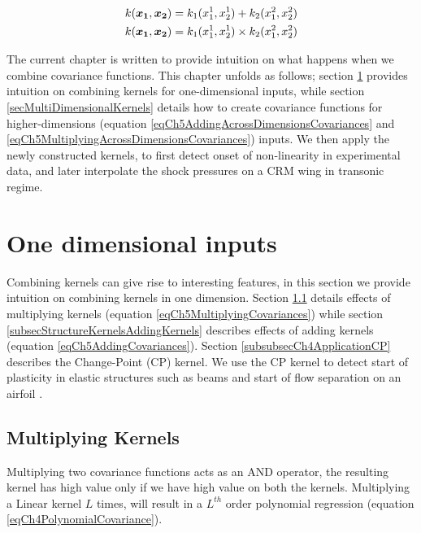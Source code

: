 \begin{align}
k(\boldsymbol{x_{1}}, \boldsymbol{x_{2}}) = k_{1}(x_{1}^{1}, x_{2}^{1}) + k_{2}(x_{1}^{2}, x_{2}^{2}) \label{eqCh5AddingAcrossDimensionsCovariances} \\
k(\boldsymbol{x_{1}}, \boldsymbol{x_{2}}) = k_{1}(x_{1}^{1}, x_{2}^{1}) \times k_{2}(x_{1}^{2}, x_{2}^{2}) \label{eqCh5MultiplyingAcrossDimensionsCovariances} 
\end{align}

The current chapter is written to provide intuition on what happens when we combine covariance functions. This chapter unfolds as follows; section \ref{secSingleDimension} provides intuition on combining kernels for one-dimensional inputs, while section \ref{secMultiDimensionalKernels} details how to create covariance functions for higher-dimensions (equation \ref{eqCh5AddingAcrossDimensionsCovariances} and \ref{eqCh5MultiplyingAcrossDimensionsCovariances}) inputs. We then apply the newly constructed kernels, to first detect onset of non-linearity in experimental data, and later interpolate the shock pressures on a CRM wing in transonic regime.

\section{One dimensional inputs}\label{secSingleDimension}
Combining kernels can give rise to interesting features, in this section we provide intuition on combining kernels in one dimension. Section \ref{subsecStructureKernelsMultiplyingKernels} details effects of multiplying kernels (equation \ref{eqCh5MultiplyingCovariances}) while section \ref{subsecStructureKernelsAddingKernels} describes effects of adding kernels (equation \ref{eqCh5AddingCovariances}). Section \ref{subsubsecCh4ApplicationCP} describes the Change-Point (CP) kernel. We use the CP kernel to detect start of plasticity in elastic structures such as beams and start of flow separation on an airfoil \cite{chiplunkar:hal-01555401}. 


\subsection{Multiplying Kernels} \label{subsecStructureKernelsMultiplyingKernels}
Multiplying two covariance functions acts as an AND operator, the resulting kernel has high value only if we have high value on both the kernels. Multiplying a Linear kernel $L$ times, will result in a $L^{th}$ order polynomial regression (equation \ref{eqCh4PolynomialCovariance}). 


